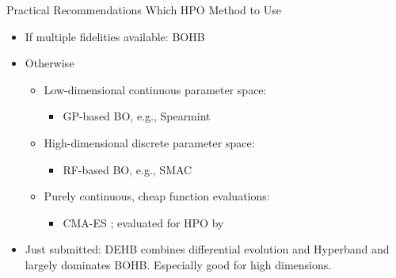 \begin{frame}[c]{Practical Recommendations Which HPO Method to Use }


\begin{itemize}
	\item If multiple fidelities available: BOHB 

\bigskip
	\item Otherwise
	\begin{itemize}
		\item Low-dimensional continuous parameter space: 
		\begin{itemize}
			\item GP-based BO, e.g., Spearmint 
		\end{itemize}
		\item High-dimensional discrete parameter space: 
		\begin{itemize}
			\item RF-based BO, e.g., SMAC 
		\end{itemize}
		\item Purely continuous, cheap function evaluations: 

		\begin{itemize}
			\item CMA-ES ;
			evaluated for HPO by 
		\end{itemize}
	\end{itemize}

	\bigskip
	\bigskip
	\pause
	\item Just submitted: \alert{DEHB} combines differential evolution and Hyperband and largely dominates BOHB. Especially good for high dimensions.
\end{itemize}

\end{frame}

